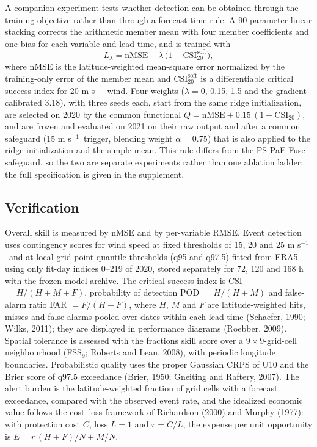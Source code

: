 \documentclass[12pt]{article}
\newcommand{\mps}{m s$^{-1}$}
\begin{document}
A companion experiment tests whether detection can be obtained through the training objective rather than through a forecast-time rule. A 90-parameter linear stacking corrects the arithmetic member mean with four member coefficients and one bias for each variable and lead time, and is trained with
\begin{equation}
L_{\lambda} = \mathrm{nMSE} + \lambda\,\bigl(1 - \mathrm{CSI}^{\mathrm{soft}}_{20}\bigr),
\label{eq:joint}
\end{equation}
where nMSE is the latitude-weighted mean-square error normalized by the training-only error of the member mean and $\mathrm{CSI}^{\mathrm{soft}}_{20}$ is a differentiable critical success index for 20 \mps\ wind. Four weights ($\lambda = 0$, 0.15, 1.5 and the gradient-calibrated 3.18), with three seeds each, start from the same ridge initialization, are selected on 2020 by the common functional $Q = \mathrm{nMSE} + 0.15\,(1 - \mathrm{CSI}_{20})$, and are frozen and evaluated on 2021 on their raw output and after a common safeguard (15 \mps\ trigger, blending weight $\alpha = 0.75$) that is also applied to the ridge initialization and the simple mean. This rule differs from the PS-PaE-Fuse safeguard, so the two are separate experiments rather than one ablation ladder; the full specification is given in the supplement.

\subsection{Verification}
\label{sec:verif}

Overall skill is measured by nMSE and by per-variable RMSE. Event detection uses contingency scores for wind speed at fixed thresholds of 15, 20 and 25 \mps\ and at local grid-point quantile thresholds (q95 and q97.5) fitted from ERA5 using only fit-day indices 0--219 of 2020, stored separately for 72, 120 and 168 h with the frozen model archive. The critical success index is CSI $= H/(H+M+F)$, probability of detection POD $= H/(H+M)$ and false-alarm ratio FAR $= F/(H+F)$, where $H$, $M$ and $F$ are latitude-weighted hits, misses and false alarms pooled over dates within each lead time (Schaefer, 1990; Wilks, 2011); they are displayed in performance diagrams (Roebber, 2009). Spatial tolerance is assessed with the fractions skill score over a $9\times9$-grid-cell neighbourhood (FSS$_{9}$; Roberts and Lean, 2008), with periodic longitude boundaries. Probabilistic quality uses the proper Gaussian CRPS of U10 and the Brier score of q97.5 exceedance (Brier, 1950; Gneiting and Raftery, 2007). The alert burden is the latitude-weighted fraction of grid cells with a forecast exceedance, compared with the observed event rate, and the idealized economic value follows the cost--loss framework of Richardson (2000) and Murphy (1977): with protection cost $C$, loss $L=1$ and $r=C/L$, the expense per unit opportunity is $E = r\,(H+F)/N + M/N$.
\end{document}
